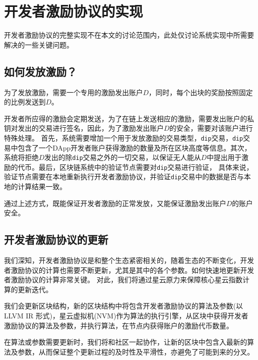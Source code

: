 \section{开发者激励协议的实现}
开发者激励协议的完整实现不在本文的讨论范围内，此处仅讨论系统实现中所需要解决的一些关键问题。

\subsection{如何发放激励？}
为了发放激励，需要一个专用的激励发出账户$D$，同时，每个出块的奖励按照固定的比例发送到$D$。

开发者所应得的激励会定期发送，为了在链上发送相应的激励，需要发出账户的私钥对发出的交易进行签名，因此，为了激励发出账户$D$的安全，需要对该账户进行特殊处理。
首先，系统需要增加一个用于发放激励的交易类型，\texttt{dip}交易，\texttt{dip}交易中包含了一个DApp开发者账户获得激励的数量及所在区块高度等信息。其次，
系统将拒绝$D$发出的除\texttt{dip}交易之外的一切交易，以保证无人能从$D$中提出用于激励的代币。最后，区块链系统中的验证节点需要对\texttt{dip}交易进行验证，
具体来说，验证节点需要在本地重新执行开发者激励协议，并验证\texttt{dip}交易中的数据是否与本地的计算结果一致。

通过上述方式，既能保证开发者激励的正常发放，又能保证激励发出账户$D$的账户安全。

\subsection{开发者激励协议的更新}
我们深知，开发者激励协议是和整个生态紧密相关的，随着生态的不断变化，开发者激励协议的计算也需要不断更新，尤其是其中的各个参数。如何快速地更新开发者激励协议的计算非常关键。
对此，我们将通过星云原力来保障核心星云指数计算的更新迭代。

我们会更新区块结构，新的区块结构中将包含开发者激励协议的算法及参数(以 LLVM IR 形式)，星云虚拟机(NVM)作为算法的执行引擎，从区块中获得开发者激励协议的算法及参数，并执行算法，在节点内获得账户的激励代币数量。

在算法或参数需要更新时，我们将和社区一起协作，让新的区块中包含入最新的算法及参数，从而保证整个更新过程的及时性及平滑性，亦避免了可能到来的分叉。
